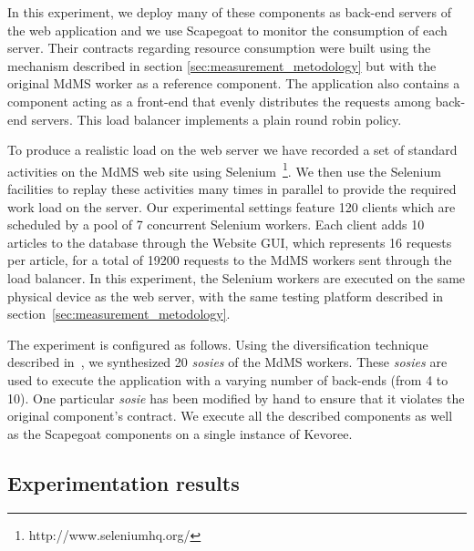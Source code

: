 In this experiment, we deploy many of these components as back-end servers of the web application and we use Scapegoat to monitor the consumption of each server.
Their contracts regarding resource consumption were built using the mechanism described in section \ref{sec:measurement_metodology} but with the original MdMS worker as a reference component.
The application also contains a component acting as a front-end that evenly distributes the requests among back-end servers.
This load balancer implements a plain round robin policy.

To produce a realistic load on the web server we have recorded a set of standard activities on the MdMS web site using Selenium~\footnote{http://www.seleniumhq.org/}.
We then use the Selenium facilities to replay these activities many times in parallel to provide the required work load on the server.
Our experimental settings feature 120 clients which are scheduled by a pool of 7 concurrent Selenium workers.
Each client adds 10 articles to the database through the Website GUI, which represents 16 requests per article, for a total of 19200 requests to the MdMS workers sent through the load balancer.
In this experiment, the Selenium workers are executed on the same physical device as the web server, with the same testing platform described in section~\ref{sec:measurement_metodology}.

The experiment is configured as follows.
Using the diversification technique described in~\cite{baudry2014tailored}, we synthesized 20 \textit{sosies} of the MdMS workers.
These \textit{sosies} are used to execute the application with a varying number of back-ends (from 4 to 10).
One particular \textit{sosie} has been modified by hand to ensure that it violates the original component's contract.
We execute all the described components as well as the Scapegoat components on a single instance of Kevoree.

\subsection{Experimentation results}

